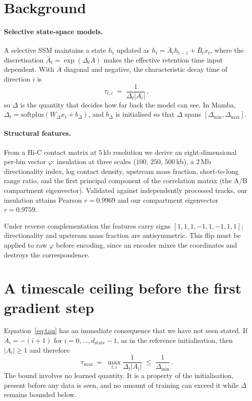 \documentclass[10pt]{article}
\begin{document}
\section{Background}

\paragraph{Selective state-space models.}
A selective SSM maintains a state $h_t$ updated as
$h_t = \bar{A}_t h_{t-1} + \bar{B}_t x_t$, where the discretisation
$\bar{A}_t = \exp(\Delta_t A)$ makes the effective retention time input
dependent. With $A$ diagonal and negative, the characteristic decay time of
direction $i$ is
\begin{equation}
\tau_{t,i} \;=\; \frac{1}{\Delta_t |A_i|}\,,
\label{eq:tau}
\end{equation}
so $\Delta$ is the quantity that decides how far back the model can see. In
Mamba, $\Delta_t = \mathrm{softplus}(W_\Delta x_t + b_\Delta)$, and $b_\Delta$ is
initialised so that $\Delta$ spans $[\Delta_{\min}, \Delta_{\max}]$.

\paragraph{Structural features.}
From a Hi-C contact matrix at $5$\,kb resolution we derive an eight-dimensional
per-bin vector $\varphi$: insulation at three scales ($100$, $250$, $500$\,kb),
a $2$\,Mb directionality index, log contact density, upstream mass fraction,
short-to-long range ratio, and the first principal component of the correlation
matrix (the A/B compartment eigenvector). Validated against independently
processed tracks, our insulation attains Pearson $r = 0.9969$ and our
compartment eigenvector $r = 0.9759$.

Under reverse complementation the features carry signs
$[1,1,1,-1,1,-1,1,1]$; directionality and upstream mass fraction are
antisymmetric. This flip must be applied to raw $\varphi$ before encoding, since
an encoder mixes the coordinates and destroys the correspondence.

\section{A timescale ceiling before the first gradient step}
\label{sec:ceiling}

Equation~\eqref{eq:tau} has an immediate consequence that we have not seen
stated. If $A_i = -(i+1)$ for $i = 0,\dots,d_{\text{state}}-1$, as in the
reference initialisation, then $|A_i| \ge 1$ and therefore
\begin{equation}
\tau_{\max} \;=\; \max_{t,i} \frac{1}{\Delta_t |A_i|} \;\le\; \frac{1}{\Delta_{\min}}\,.
\label{eq:ceiling}
\end{equation}
The bound involves no learned quantity. It is a property of the initialisation,
present before any data is seen, and no amount of training can exceed it while
$\Delta$ remains bounded below.
\end{document}
